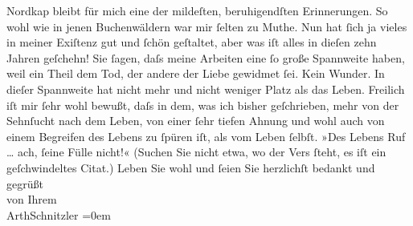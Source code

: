 \begin{ledgroupsized}[t]{13cm}
{{{                  Nordkap}}}\label{K_L01590_2h} bleibt für mich eine der mildeſten,
               beruhigendſten Erinnerungen. So wohl wie in jenen Buchenwäldern war mir ſelten zu
               Muthe. Nun hat ſich ja vieles in meiner Exiſtenz gut und ſchön geſtaltet, aber was
               iſt alles in dieſen zehn Jahren geſchehn! Sie ſagen, daſs meine Arbeiten eine ſo
               große Spannweite haben, weil ein Theil dem Tod, der andere der Liebe gewidmet {\pb}ſei. Kein Wunder. In dieſer Spannweite hat nicht
               mehr und nicht weniger Platz als das Leben. Freilich iſt mir ſehr wohl bewußt, daſs
               in dem, was ich bisher geſchrieben, mehr von der Sehnſucht nach dem Leben, von einer
               ſehr tiefen Ahnung und wohl auch von einem Begreifen des Lebens zu ſpüren iſt, als
               vom Leben ſelbſt. »Des Lebens Ruf {\dots} ach, ſeine Fülle
               nicht!« (Suchen Sie nicht etwa, wo der Vers {\pb}ſteht, es iſt ein geſchwindeltes Citat.)\pend
           \pstart
           Leben Sie wohl und ſeien Sie herzlichſt bedankt und gegrüßt{\\[\baselineskip]}von Ihrem{\\[\baselineskip]}\spacefill\mbox{ArthSchnitzler}\pend
           \leftskip=0em{}
         
         \endnumbering{}\end{ledgroupsized}  \newcommand{\dateiname}{L01590}\newcommand{\titel}{Arthur Schnitzler an Georg Brandes, 13. 3. 1906}\newcommand{\editorInnen}{Martin Anton Müller und Gerd-Hermann Susen}
      